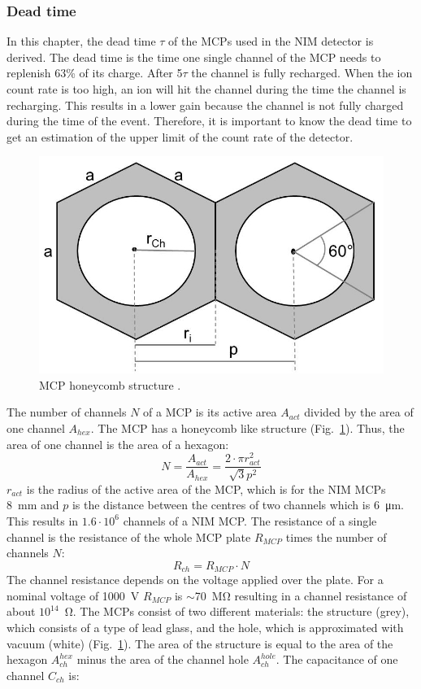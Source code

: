 	\subsubsection{Dead time}
	In this chapter, the dead time $\tau$ of the MCPs used in the NIM detector is derived. The dead time is the time one single channel of the MCP needs to replenish 63\% of its charge. After 5$\tau$ the channel is fully recharged. When the ion count rate is too high, an ion will hit the channel during the time the channel is recharging. This results in a lower gain because the channel is not fully charged during the time of the event. Therefore, it is important to know the dead time to get an estimation of the upper limit of the count rate of the detector.\\
	\begin{figure}[H]
		\centering
		\includegraphics[width=.4\textwidth]{Bilder/MCP_hex.jpg}
		\caption{MCP honeycomb structure \cite{Diss_Neuland}.}
		\label{fig:MCPhex}
	\end{figure}
	The number of channels $N$ of a MCP is its active area $A_{act}$ divided by the area of one channel $A_{hex}$. The MCP has a honeycomb like structure (Fig.~\ref{fig:MCPhex}). Thus, the area of one channel is the area of a hexagon:
	\begin{equation}
		N = \frac{A_{act}}{A_{hex}} = \frac{2\cdot\pi r^2_{act}}{\sqrt{3}p^2}
	\end{equation}
	$r_{act}$ is the radius of the active area of the MCP, which is for the NIM MCPs 8~mm and $p$ is the distance between the centres of two channels which is 6~\si{\micro\meter}. This results in $1.6\cdot10^6$ channels of a NIM MCP. The resistance of a single channel is the resistance of the whole MCP plate $R_{MCP}$ times the number of channels $N$:
	\begin{equation}
		R_{ch} = R_{MCP}\cdot N
	\end{equation}
	The channel resistance depends on the voltage applied over the plate. For a nominal voltage of 1000~\si{\volt} $R_{MCP}$ is $\sim$70~\si{\mega\ohm} resulting in a channel resistance of about $10^{14}$~\si{\ohm}. The MCPs consist of two different materials: the structure (grey), which consists of a type of lead glass, and the hole, which is approximated with vacuum (white) (Fig.~\ref{fig:MCPhex}). The area of the structure is equal to the area of the hexagon $A^{hex}_{ch}$ minus the area of the channel hole $A^{hole}_{ch}$. The capacitance of one channel $C_{ch}$ is:
